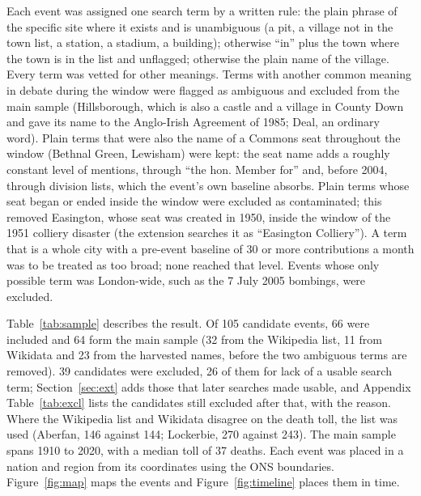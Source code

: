 \documentclass[11pt,a4paper]{article}
\begin{document}
Each event was assigned one search term by a written rule: the plain phrase of the specific site where it exists and is unambiguous (a pit, a village not in the town list, a station, a stadium, a building); otherwise ``in'' plus the town where the town is in the list and unflagged; otherwise the plain name of the village. Every term was vetted for other meanings. Terms with another common meaning in debate during the window were flagged as ambiguous and excluded from the main sample (Hillsborough, which is also a castle and a village in County Down and gave its name to the Anglo-Irish Agreement of 1985; Deal, an ordinary word). Plain terms that were also the name of a Commons seat throughout the window (Bethnal Green, Lewisham) were kept: the seat name adds a roughly constant level of mentions, through ``the hon. Member for'' and, before 2004, through division lists, which the event's own baseline absorbs. Plain terms whose seat began or ended inside the window were excluded as contaminated; this removed Easington, whose seat was created in 1950, inside the window of the 1951 colliery disaster (the extension searches it as ``Easington Colliery''). A term that is a whole city with a pre-event baseline of 30 or more contributions a month was to be treated as too broad; none reached that level. Events whose only possible term was London-wide, such as the 7 July 2005 bombings, were excluded.

Table~\ref{tab:sample} describes the result. Of 105 candidate events, 66 were included and 64 form the main sample (32 from the Wikipedia list, 11 from Wikidata and 23 from the harvested names, before the two ambiguous terms are removed). 39 candidates were excluded, 26 of them for lack of a usable search term; Section~\ref{sec:ext} adds those that later searches made usable, and Appendix Table~\ref{tab:excl} lists the candidates still excluded after that, with the reason. Where the Wikipedia list and Wikidata disagree on the death toll, the list was used (Aberfan, 146 against 144; Lockerbie, 270 against 243). The main sample spans 1910 to 2020, with a median toll of 37 deaths. Each event was placed in a nation and region from its coordinates using the ONS boundaries. Figure~\ref{fig:map} maps the events and Figure~\ref{fig:timeline} places them in time.
\end{document}
